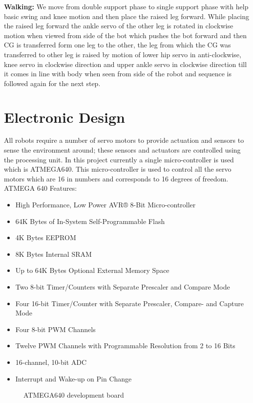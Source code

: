 \documentclass[12pt]{article}
\begin{document}
\newpage
\textbf{Walking:} We move from double support phase to single support phase with help basic
swing and knee motion and then place the raised leg forward. While placing the raised leg
forward the ankle servo of the other leg is rotated in clockwise motion when viewed from
side of the bot which pushes the bot forward and then CG is transferred form one leg to the
other, the leg from which the CG was transferred to other leg is raised by motion of lower
hip servo in anti-clockwise, knee servo in clockwise direction and upper ankle servo in
clockwise direction till it comes in line with body when seen from side of the robot and
sequence is followed again for the next step.


\section{Electronic Design}
All robots require a number of servo motors to provide actuation and sensors to sense the
environment around; these sensors and actuators are controlled using the processing unit.
In this project currently a single micro-controller is used which is ATMEGA640. This
micro-controller is used to control all the servo motors which are 16 in numbers and
corresponds to 16 degrees of freedom.\\
ATMEGA 640 Features:
\begin{itemize}
	\item High Performance, Low Power AVR® 8-Bit Micro-controller
	\item 64K Bytes of In-System Self-Programmable Flash
	\item 4K Bytes EEPROM
	\item 8K Bytes Internal SRAM
	\item Up to 64K Bytes Optional External Memory Space
	\item Two 8-bit Timer/Counters with Separate Prescaler and Compare Mode
	\item Four 16-bit Timer/Counter with Separate Prescaler, Compare- and Capture Mode
	\item Four 8-bit PWM Channels
	\item Twelve PWM Channels with Programmable Resolution from 2 to 16 Bits
	\item 16-channel, 10-bit ADC
	\item Interrupt and Wake-up on Pin Change
\end{itemize}
\begin{figure}[h!]
	\centering
	\caption{ATMEGA640 development board}
\end{figure}
\newpage
\end{document}

